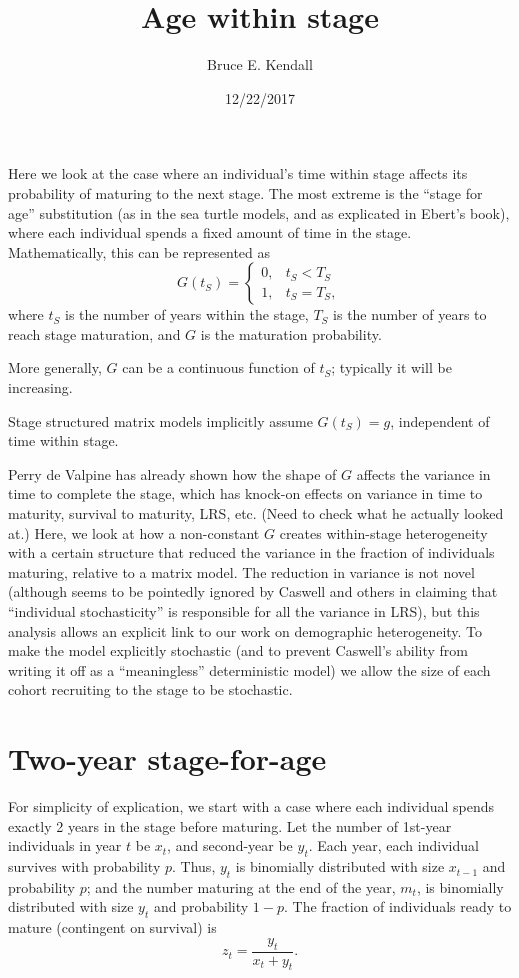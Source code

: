 \documentclass[
]{article}
\title{Age within stage}
\author{Bruce E. Kendall}
\date{12/22/2017}
\begin{document}
\maketitle

Here we look at the case where an individual's time within stage affects
its probability of maturing to the next stage. The most extreme is the
``stage for age'' substitution (as in the sea turtle models, and as
explicated in Ebert's book), where each individual spends a fixed amount
of time in the stage. Mathematically, this can be represented as
\begin{equation}
G(t_S) = \begin{cases}
          0, & t_S < T_S \\
          1, & t_S = T_S,
        \end {cases}
\end{equation} where \(t_S\) is the number of years within the stage,
\(T_S\) is the number of years to reach stage maturation, and \(G\) is
the maturation probability.

More generally, \(G\) can be a continuous function of \(t_S\); typically
it will be increasing.

Stage structured matrix models implicitly assume \(G(t_S) = g\),
independent of time within stage.

Perry de Valpine has already shown how the shape of \(G\) affects the
variance in time to complete the stage, which has knock-on effects on
variance in time to maturity, survival to maturity, LRS, etc. (Need to
check what he actually looked at.) Here, we look at how a non-constant
\(G\) creates within-stage heterogeneity with a certain structure that
reduced the variance in the fraction of individuals maturing, relative
to a matrix model. The reduction in variance is not novel (although
seems to be pointedly ignored by Caswell and others in claiming that
``individual stochasticity'' is responsible for all the variance in
LRS), but this analysis allows an explicit link to our work on
demographic heterogeneity. To make the model explicitly stochastic (and
to prevent Caswell's ability from writing it off as a ``meaningless''
deterministic model) we allow the size of each cohort recruiting to the
stage to be stochastic.

\section{Two-year stage-for-age}\label{two-year-stage-for-age}

For simplicity of explication, we start with a case where each
individual spends exactly 2 years in the stage before maturing. Let the
number of 1st-year individuals in year \(t\) be \(x_t\), and second-year
be \(y_t\). Each year, each individual survives with probability \(p\).
Thus, \(y_t\) is binomially distributed with size \(x_{t-1}\) and
probability \(p\); and the number maturing at the end of the year,
\(m_t\), is binomially distributed with size \(y_t\) and probability
\(1-p\). The fraction of individuals ready to mature (contingent on
survival) is \begin{equation}
z_t = \frac{y_t}{x_t+y_t}.\end{equation}
\end{document}
